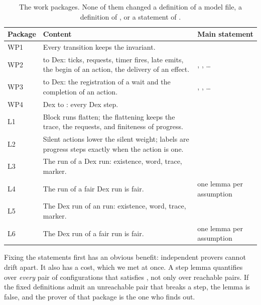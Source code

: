 \begin{table}[t]
\centering
\small
\begin{tabularx}{\textwidth}{@{}P{1.35cm}LP{5.4cm}@{}}
\toprule
Package & Content & Main statement \\
\midrule
WP1 & Every \Lang{} transition keeps the \Lang{} invariant. &
   \\
WP2 & \Lang{} to Dex: ticks, requests, timer fires, late emits, the begin of
  an action, the delivery of an effect. &
  , , \ldots \\
WP3 & \Lang{} to Dex: the registration of a wait and the completion of an
  action. & ,
  , \ldots \\
WP4 & Dex to \Lang{}: every Dex step. &  \\
\midrule
L1 & Block runs flatten; the flattening keeps the trace, the requests, and
  finiteness of progress. &  \\
L2 & Silent actions lower the silent weight; labels are progress steps
  exactly when the action is one. &
   \\
L3 & The \Lang{} run of a Dex run: existence, word, trace, marker. &
   \\
L4 & The \Lang{} run of a fair Dex run is fair. & one lemma per assumption \\
L5 & The Dex run of an \Lang{} run: existence, word, trace, marker. &
   \\
L6 & The Dex run of a fair \Lang{} run is fair. & one lemma per assumption \\
\bottomrule
\end{tabularx}
\caption{The work packages. None of them changed a definition of a model
file, a definition of , or a statement of
.}
\label{tab:packages}
\end{table}

Fixing the statements first has an obvious benefit: independent provers
cannot drift apart. It also has a cost, which we met at once. A step lemma
quantifies over \emph{every} pair of configurations that satisfies
, not only over reachable pairs. If the fixed
definitions admit an unreachable pair that breaks a step, the lemma is
false, and the prover of that package is the one who finds out.


